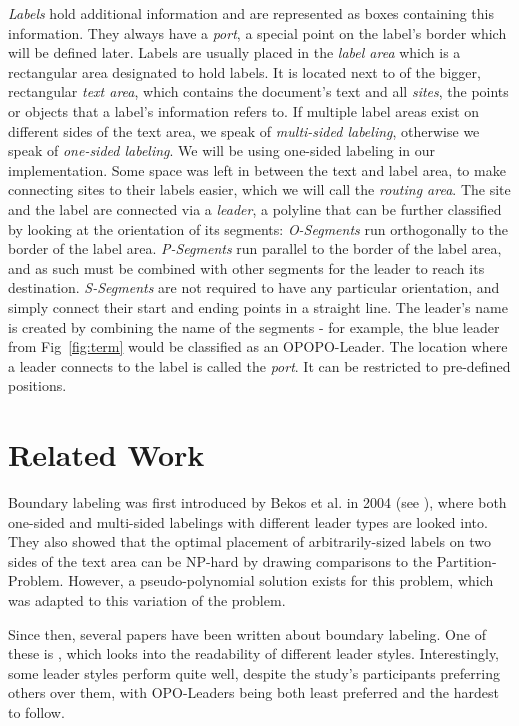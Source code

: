 \documentclass[11pt,a4paper]{vutinfth}
\begin{document}
\emph{Labels} hold additional information and are represented as boxes containing this information. They always have a \emph{port}, a special point on the label's border which will be defined later. Labels are usually placed in the \emph{label area} which is a rectangular area designated to hold labels. It is located next to of the bigger, rectangular \emph{text area}, which contains the document's text and all \emph{sites}, the points or objects that a label's information refers to. If multiple label areas exist on different sides of the text area, we speak of \emph{multi-sided labeling}, otherwise we speak of \emph{one-sided labeling}. We will be using one-sided labeling in our implementation. Some space was left in between the text and label area, to make connecting sites to their labels easier, which we will call the \emph{routing area}. The site and the label are connected via a \emph{leader}, a polyline that can be further classified by looking at the orientation of its segments: \emph{O-Segments} run orthogonally to the border of the label area. \emph{P-Segments} run parallel to the border of the label area, and as such must be combined with other segments for the leader to reach its destination. \emph{S-Segments} are not required to have any particular orientation, and simply connect their start and ending points in a straight line.
The leader's name is created by combining the name of the segments - for example, the blue leader from Fig~\ref*{fig:term} would be classified as an OPOPO-Leader.
The location where a leader connects to the label is called the \emph{port}. It can be restricted to pre-defined positions. 


\section{Related Work}

Boundary labeling was first introduced by Bekos et al. in 2004 (see \cite{Bekos2005}), where both one-sided and multi-sided labelings with different leader types are looked into. They also showed that the optimal placement of arbitrarily-sized labels on two sides of the text area can be NP-hard by drawing comparisons to the Partition-Problem. However, a pseudo-polynomial solution exists for this problem, which was adapted to this variation of the problem.

Since then, several papers have been written about boundary labeling. One of these is \cite{Barth2015}, which looks into the readability of different leader styles. Interestingly, some leader styles perform quite well, despite the study's participants preferring others over them, with OPO-Leaders being both least preferred and the hardest to follow.
\end{document}
